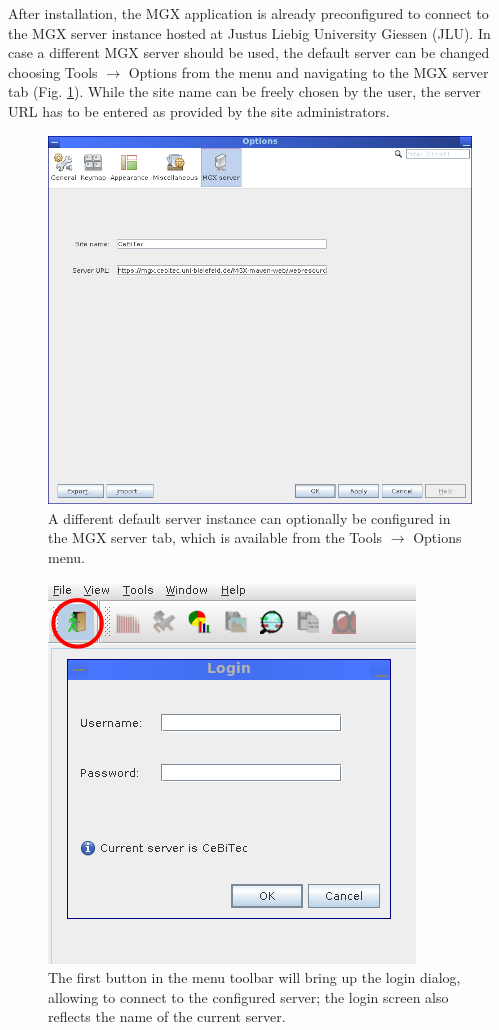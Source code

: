 After installation, the MGX application is already preconfigured to connect to the 
MGX server instance hosted at Justus Liebig University Giessen (JLU). In case a different MGX server
should be used, the default server can be changed choosing Tools $\rightarrow$ Options from the menu
and navigating to the MGX server tab (Fig. \ref{config-site}). While the site name can be freely
chosen by the user, the server URL has to be entered as provided by the site administrators.

\begin{figure}[H]
\centering
\includegraphics[width=.8\textwidth]{img/mgx/config-site}
\caption[Server configuration]{A different default server instance can optionally be configured in the MGX 
server tab, which is available from the Tools $\rightarrow$ Options menu.}
\label{config-site}
\end{figure}


\begin{figure}[H]
\centering
\includegraphics[width=.6\textwidth]{img/mgx/login}
\caption[Login screen]{The first button in the menu toolbar will bring up the login dialog, allowing to connect to the configured server; the login screen also reflects the name of the current server.}
\label{login-screen}
\end{figure}

